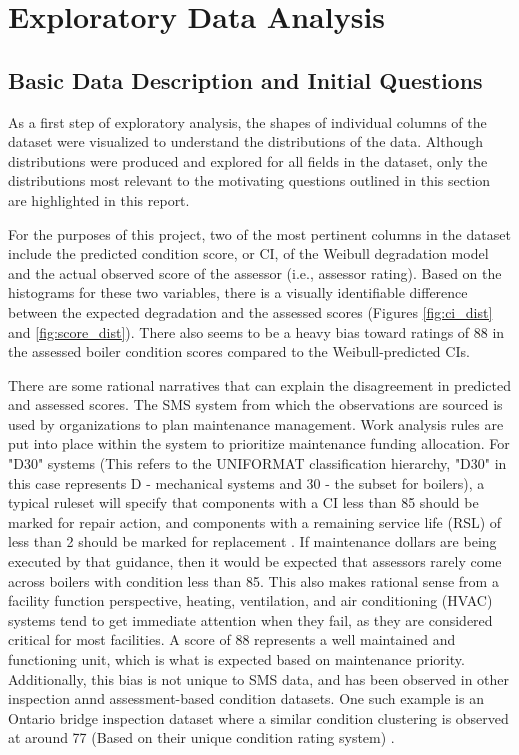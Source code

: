 \documentclass[NewProceedings,letterpaper,NoPageNumbers,NoLineNumbers, DoubleSpace]{ascelike-new}
\begin{document}
\FloatBarrier

\section{Exploratory Data Analysis}

\subsection{Basic Data Description and Initial Questions}

As a first step of exploratory analysis, the shapes of individual columns of the dataset were visualized to understand the distributions of the data. Although distributions were produced and explored for all fields in the dataset, only the distributions most relevant to the motivating questions outlined in this section are highlighted in this report. 

For the purposes of this project, two of the most pertinent columns in the dataset include the predicted condition score, or CI, of the Weibull degradation model and the actual observed score of the assessor (i.e., assessor rating).  Based on the histograms for these two variables, there is a visually identifiable difference between the expected degradation and the assessed scores (Figures \ref{fig:ci_dist} and \ref{fig:score_dist}). There also seems to be a heavy bias toward ratings of 88 in the assessed boiler condition scores compared to the Weibull-predicted CIs.

There are some rational narratives that can explain the disagreement in predicted and assessed scores.  The SMS system from which the observations are sourced is used by organizations to plan maintenance management.  Work analysis rules are put into place within the system to prioritize maintenance funding allocation.  For "D30" systems (This refers to the UNIFORMAT classification hierarchy, "D30" in this case represents D - mechanical systems and 30 - the subset for boilers), a typical ruleset will specify that components with a CI less than 85 should be marked for repair action, and components with a remaining service life (RSL) of less than 2 should be marked for replacement \cite{rsmeans_uniformatii}. If maintenance dollars are being executed by that guidance, then it would be expected that assessors rarely come across boilers with condition less than 85.  This also makes rational sense from a facility function perspective, heating, ventilation, and air conditioning (HVAC) systems tend to get immediate attention when they fail, as they are considered critical for most facilities. A score of 88 represents a well maintained and functioning unit, which is what is expected based on maintenance priority. Additionally, this bias is not unique to SMS data, and has been observed in other inspection annd assessment-based condition datasets. One such example is an Ontario bridge inspection dataset where a similar condition clustering is observed at around 77 (Based on their unique condition rating system) \cite{ontario_bridge_conditions_2021}.
\end{document}
